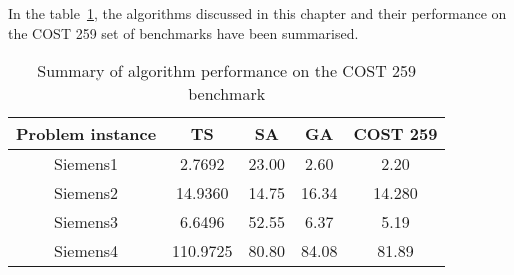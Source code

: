 In the table~\ref{tab:summary1}, the algorithms discussed in this chapter and their performance on the \gls{COST} 259 set of benchmarks have been summarised.
\begin{table}[H]
\label{tbl:summaryMetaTable}
\begin{center}
	\begin{tabular}{| c | c | c | c | c |}
	\hline
	Problem instance & \gls{TS} & \gls{SA} & \gls{GA} & \gls{COST} 259 \\ \hline
	Siemens1 & 2.7692 & 23.00 & 2.60 & 2.20 \\ \hline
	Siemens2 & 14.9360 & 14.75 & 16.34 & 14.280 \\ \hline
	Siemens3 & 6.6496 & 52.55 & 6.37 & 5.19 \\ \hline
	Siemens4 & 110.9725 & 80.80 & 84.08 & 81.89 \\ \hline
	\end{tabular}
\caption{Summary of algorithm performance on the \gls{COST} 259 benchmark}
\label{tab:summary1}
\end{center}
\end{table}
